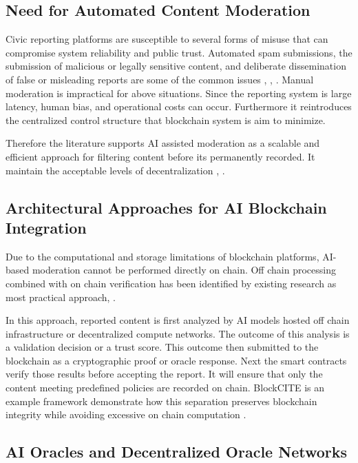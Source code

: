 \subsection{Need for Automated Content Moderation}

Civic reporting platforms are susceptible to several forms of misuse that can compromise system reliability and public trust. Automated spam submissions, the submission of malicious or legally sensitive content, and deliberate dissemination of false or misleading reports are some of the common issues \cite{wani2024ai}, \cite{gosztonyi2024theory}, \cite{kolluri2025aipowered}. Manual moderation is impractical for above situations. Since the reporting system is large latency, human bias, and operational costs can occur. Furthermore it reintroduces the centralized control structure that blockchain system is aim to minimize. 

Therefore the literature supports AI assisted moderation as a scalable and  efficient approach for filtering content before its permanently recorded. It maintain the acceptable levels of decentralization \cite{mohammadi2025ai}, \cite{goundar2025blockchain}.

\subsection{Architectural Approaches for AI Blockchain Integration}

Due to the computational and storage limitations of blockchain platforms, AI-based moderation cannot be performed directly on chain. Off chain processing combined with on chain verification has been identified by existing research as most practical approach\cite{goundar2025blockchain}, \cite{kader2024enhancing}.  

In this approach, reported content is first analyzed by AI models hosted off chain infrastructure or decentralized compute networks. The outcome of this analysis is a validation decision or a trust score. This outcome then submitted to the blockchain as a cryptographic proof or oracle response. Next the smart contracts verify those results before accepting the report. It will ensure that only the content meeting predefined policies are recorded on chain. BlockCITE is an example framework demonstrate how this separation preserves blockchain integrity while avoiding excessive on chain computation \cite{li2025blockcite}.

\subsection{\ac{AI} Oracles and Decentralized Oracle Networks}

